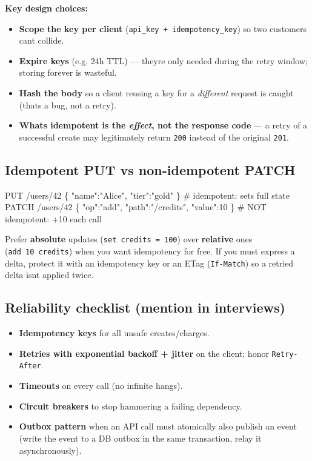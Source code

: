 \documentclass[11pt]{article}
\providecommand{\tightlist}{\setlength{\itemsep}{1pt}\setlength{\parskip}{0pt}}
\newenvironment{Shaded}{\begin{snugshade}}{\end{snugshade}}
\newcommand{\NormalTok}[1]{\textcolor[rgb]{0.81,0.81,0.76}{#1}}
\begin{document}
\textbf{Key design choices:}

\begin{itemize}
\tightlist
\item
  \textbf{Scope the key per client} (\texttt{api\_key\ +\ idempotency\_key}) so two customers can\textquotesingle t collide.
\item
  \textbf{Expire keys} (e.g. 24h TTL) --- they\textquotesingle re only needed during the retry window; storing forever is wasteful.
\item
  \textbf{Hash the body} so a client reusing a key for a \emph{different} request is caught (that\textquotesingle s a bug, not a retry).
\item
  \textbf{What\textquotesingle s idempotent is the \emph{effect}, not the response code} --- a retry of a successful create may legitimately return \texttt{200} instead of the original \texttt{201}.
\end{itemize}

\subsection{Idempotent PUT vs non-idempotent PATCH}\label{idempotent-put-vs-non-idempotent-patch}


\begin{Shaded}
\begin{Highlighting}[]
\NormalTok{PUT /users/42  \{ "name":"Alice", "tier":"gold" \}     \# idempotent: sets full state}
\NormalTok{PATCH /users/42  \{ "op":"add", "path":"/credits", "value":10 \}   \# NOT idempotent: +10 each call}
\end{Highlighting}
\end{Shaded}

Prefer \textbf{absolute} updates (\texttt{set\ credits\ =\ 100}) over \textbf{relative} ones (\texttt{add\ 10\ credits}) when you want idempotency for free. If you must express a delta, protect it with an idempotency key or an ETag (\texttt{If-Match}) so a retried delta isn\textquotesingle t applied twice.

\subsection{Reliability checklist (mention in interviews)}\label{reliability-checklist-mention-in-interviews}

\begin{itemize}
\tightlist
\item
  \textbf{Idempotency keys} for all unsafe creates/charges.
\item
  \textbf{Retries with exponential backoff + jitter} on the client; honor \texttt{Retry-After}.
\item
  \textbf{Timeouts} on every call (no infinite hangs).
\item
  \textbf{Circuit breakers} to stop hammering a failing dependency.
\item
  \textbf{Outbox pattern} when an API call must atomically also publish an event (write the event to a DB outbox in the same transaction, relay it asynchronously).
\end{itemize}
\end{document}
